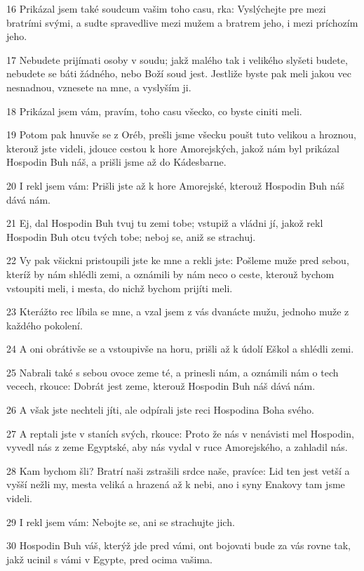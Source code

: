 \par 16 Prikázal jsem také soudcum vašim toho casu, rka: Vyslýchejte pre mezi bratrími svými, a sudte spravedlive mezi mužem a bratrem jeho, i mezi príchozím jeho.
\par 17 Nebudete prijímati osoby v soudu; jakž malého tak i velikého slyšeti budete, nebudete se báti žádného, nebo Boží soud jest. Jestliže byste pak meli jakou vec nesnadnou, vznesete na mne, a vyslyším ji.
\par 18 Prikázal jsem vám, pravím, toho casu všecko, co byste ciniti meli.
\par 19 Potom pak hnuvše se z Oréb, prešli jsme všecku poušt tuto velikou a hroznou, kterouž jste videli, jdouce cestou k hore Amorejských, jakož nám byl prikázal Hospodin Buh náš, a prišli jsme až do Kádesbarne.
\par 20 I rekl jsem vám: Prišli jste až k hore Amorejské, kterouž Hospodin Buh náš dává nám.
\par 21 Ej, dal Hospodin Buh tvuj tu zemi tobe; vstupiž a vládni jí, jakož rekl Hospodin Buh otcu tvých tobe; neboj se, aniž se strachuj.
\par 22 Vy pak všickni pristoupili jste ke mne a rekli jste: Pošleme muže pred sebou, kteríž by nám shlédli zemi, a oznámili by nám neco o ceste, kterouž bychom vstoupiti meli, i mesta, do nichž bychom prijíti meli.
\par 23 Kterážto rec líbila se mne, a vzal jsem z vás dvanácte mužu, jednoho muže z každého pokolení.
\par 24 A oni obrátivše se a vstoupivše na horu, prišli až k údolí Eškol a shlédli zemi.
\par 25 Nabrali také s sebou ovoce zeme té, a prinesli nám, a oznámili nám o tech vecech, rkouce: Dobrát jest zeme, kterouž Hospodin Buh náš dává nám.
\par 26 A však jste nechteli jíti, ale odpírali jste reci Hospodina Boha svého.
\par 27 A reptali jste v staních svých, rkouce: Proto že nás v nenávisti mel Hospodin, vyvedl nás z zeme Egyptské, aby nás vydal v ruce Amorejského, a zahladil nás.
\par 28 Kam bychom šli? Bratrí naši zstrašili srdce naše, pravíce: Lid ten jest vetší a vyšší nežli my, mesta veliká a hrazená až k nebi, ano i syny Enakovy tam jsme videli.
\par 29 I rekl jsem vám: Nebojte se, ani se strachujte jich.
\par 30 Hospodin Buh váš, kterýž jde pred vámi, ont bojovati bude za vás rovne tak, jakž ucinil s vámi v Egypte, pred ocima vašima.
